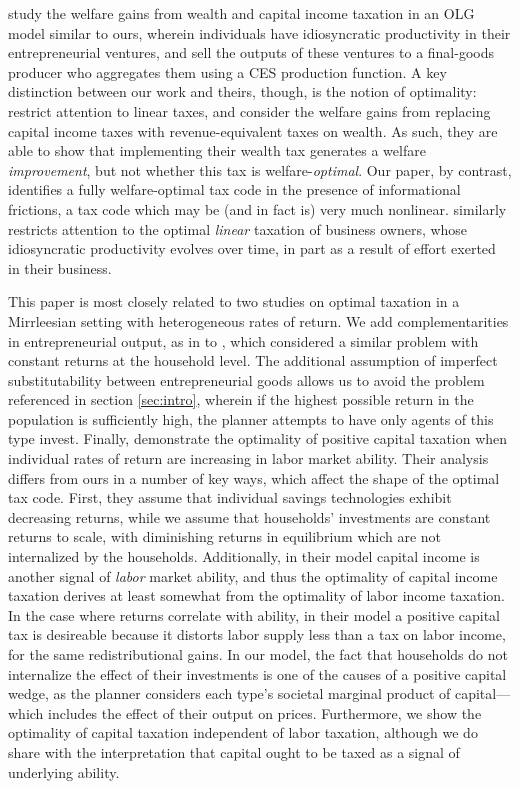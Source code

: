 \documentclass[11pt]{article}
\begin{document}
\cite{guvenen2019use} study the welfare gains from wealth and capital income taxation in an OLG model similar to ours, wherein individuals have idiosyncratic productivity in their entrepreneurial ventures, and sell the outputs of these ventures to a final-goods producer who aggregates them using a CES production function. A key distinction between our work and theirs, though, is the notion of optimality: \cite{guvenen2019use} restrict attention to linear taxes, and consider the welfare gains from replacing capital income taxes with revenue-equivalent taxes on wealth. As such, they are able to show that implementing their wealth tax generates a welfare \textit{improvement}, but not whether this tax is welfare-\textit{optimal}. Our paper, by contrast, identifies a fully welfare-optimal tax code in the presence of informational frictions, a tax code which may be (and in fact is) very much nonlinear. \cite{phelan2021optimal} similarly restricts attention to the optimal \textit{linear} taxation of business owners, whose idiosyncratic productivity evolves over time, in part as a result of effort exerted in their business. 

This paper is most closely related to two studies on optimal taxation in a Mirrleesian setting with heterogeneous rates of return. We add complementarities in entrepreneurial output, as in \cite{dixit1977monopolistic} to \cite{shourideh2014optimal}, which considered a similar problem with constant returns at the household level. The additional assumption of imperfect substitutability between entrepreneurial goods allows us to avoid the problem referenced in section \ref{sec:intro}, wherein if the highest possible return in the population is sufficiently high, the planner attempts to have only agents of this type invest. Finally, \cite{gerritsen2020optimal} demonstrate the optimality of positive capital taxation when individual rates of return are increasing in labor market ability. Their analysis differs from ours in a number of key ways, which affect the shape of the optimal tax code. First, they assume that individual savings technologies exhibit decreasing returns, while we assume that households' investments are constant returns to scale, with diminishing returns in equilibrium which are not internalized by the households. Additionally, in their model capital income is another signal of \textit{labor} market ability, and thus the optimality of capital income taxation derives at least somewhat from the optimality of labor income taxation. In the case where returns correlate with ability, in their model a positive capital tax is desireable because it distorts labor supply less than a tax on labor income, for the same redistributional gains. In our model, the fact that households do not internalize the effect of their investments is one of the causes of a positive capital wedge, as the planner considers each type's societal marginal product of capital---which includes the effect of their output on prices. Furthermore, we show the optimality of capital taxation independent of labor taxation, although we do share with \cite{gerritsen2020optimal} the interpretation that capital ought to be taxed as a signal of underlying ability. 
\end{document}
